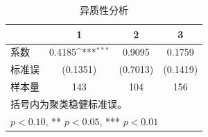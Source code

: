 \begin{table}[htbp]
\centering
\caption{异质性分析}
\label{tab:heterogeneity}
\def\sym#1{\ifmmode^{#1}\else\(^{#1}\)\fi}
\begin{tabular}{lccc}
\toprule
 & \multicolumn{1}{c}{1} & \multicolumn{1}{c}{2} & \multicolumn{1}{c}{3} \\
\midrule
系数 & 0.4185\sym{***} & 0.9095 & 0.1759 \\
标准误 & (0.1351) & (0.7013) & (0.1419) \\
样本量 & 143 & 104 & 156 \\
\bottomrule
\multicolumn{4}{l}{\footnotesize 括号内为聚类稳健标准误。}\\
\multicolumn{4}{l}{\footnotesize * $p<0.10$, ** $p<0.05$, *** $p<0.01$}\\
\end{tabular}
\end{table}